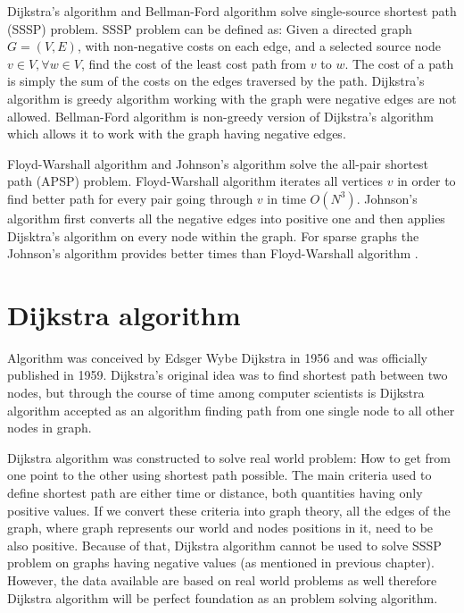 \documentclass[thesis=M,english]{FITthesis}[2012/10/20]
\begin{document}
Dijkstra's algorithm \cite{Dijkstra59} and Bellman-Ford algorithm \cite{Bellman58, FordFulkerson62} solve single-source shortest path (SSSP) problem. SSSP problem can be defined as: Given a directed graph $G = (V,E)$, with non-negative costs on each edge, and a selected source node $v \in V, \forall w \in V$, find the cost of the least cost path from $v$ to $w$. The cost of a path is simply the sum of the costs on the edges traversed by the path. Dijkstra's algorithm is greedy algorithm working with the graph were negative edges are not allowed. Bellman-Ford algorithm is non-greedy version of Dijkstra's algorithm which allows it to work with the graph having negative edges.

Floyd-Warshall algorithm \cite{Warshall62, Floyd56} and Johnson's algorithm \cite{Johnson77} solve the all-pair shortest path (APSP) problem. Floyd-Warshall algorithm iterates all vertices $v$ in order to find better path for every pair going through $v$ in time $O(N^3)$. Johnson's algorithm first converts all the negative edges into positive one and then applies Dijsktra's algorithm on every node within the graph. 
For sparse graphs the Johnson's algorithm provides better times than Floyd-Warshall algorithm \cite{Cormen01}.

\section{Dijkstra algorithm}
\label{sec:dijsktra}
Algorithm was conceived by Edsger Wybe Dijkstra in 1956 and was officially published in 1959. Dijkstra's original idea was to find shortest path between two nodes, but through the course of time among computer scientists is Dijkstra algorithm accepted as an algorithm finding path from one single node to all other nodes in graph. 


Dijkstra algorithm was constructed to solve real world problem: How to get from one point to the other using shortest path possible. %
The main criteria used to define shortest path are either time or distance, both quantities having only positive values. If we convert these criteria into graph theory, all the edges of the graph, where graph represents our world and nodes positions in it, need to be also positive.
Because of that, Dijkstra algorithm cannot be used to solve SSSP problem on graphs having negative values (as mentioned in previous chapter). However, the data available are based on real world problems as well therefore Dijkstra algorithm will be perfect foundation as an problem solving algorithm. 
\end{document}
